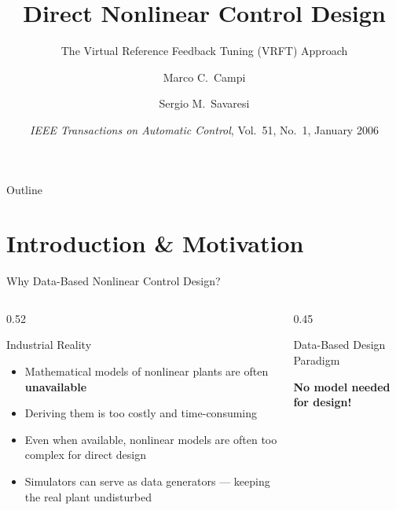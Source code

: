\documentclass[aspectratio=169]{beamer}
\title[Nonlinear VRFT]{Direct Nonlinear Control Design}
\subtitle{The Virtual Reference Feedback Tuning (VRFT) Approach}
\author[Campi \& Savaresi]{Marco C.~Campi \and Sergio M.~Savaresi}
\institute[]{Università di Brescia \quad \& \quad Politecnico di Milano}
\date{\textit{IEEE Transactions on Automatic Control}, Vol.~51, No.~1, January 2006}
\newcommand{\highlight}[1]{{\color{accentgreen!70!black}\textbf{#1}}}
\newcommand{\alerttext}[1]{{\color{alertred}\textbf{#1}}}
\begin{document}

\begin{frame}[plain]
  \titlepage
\end{frame}

\begin{frame}{Outline}
  \tableofcontents
\end{frame}

\section{Introduction \& Motivation}

\begin{frame}{Why Data-Based Nonlinear Control Design?}
  \begin{columns}[T]
    \begin{column}{0.52\textwidth}
      \begin{alertblock}{Industrial Reality}
        \begin{itemize}
          \item Mathematical models of nonlinear plants are often \alerttext{unavailable}
          \item Deriving them is too costly and time-consuming
          \item Even when available, nonlinear models are often too complex for direct design
          \item Simulators can serve as data generators --- keeping the real plant undisturbed
        \end{itemize}
      \end{alertblock}
    \end{column}
    \begin{column}{0.45\textwidth}
      \begin{block}{Data-Based Design Paradigm}
        \centering
      \end{block}
      \vspace{0.3em}
      \highlight{No model needed for design!}
    \end{column}
  \end{columns}
\end{frame}
\end{document}
